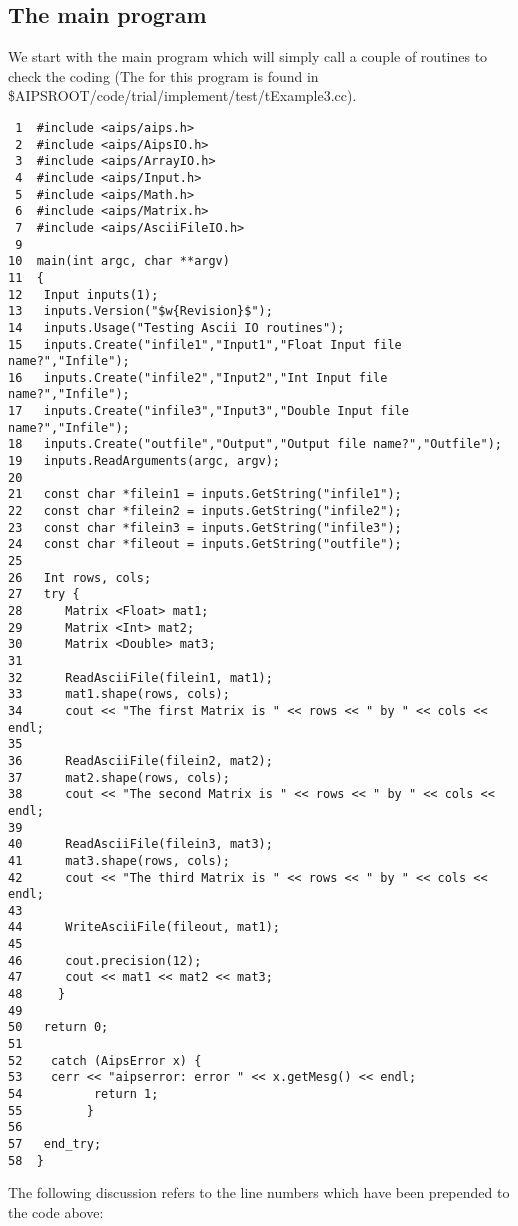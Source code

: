 \subsection{The main program}

We start with the main program which will simply call a couple of routines to
check the coding 
(The 
for this program is found in 
\$AIPSROOT/code/trial/implement/test/tExample3.cc). 

\begin{verbatim}
 1  #include <aips/aips.h>
 2  #include <aips/AipsIO.h>
 3  #include <aips/ArrayIO.h>
 4  #include <aips/Input.h>
 5  #include <aips/Math.h>
 6  #include <aips/Matrix.h>
 7  #include <aips/AsciiFileIO.h>
 9  
10  main(int argc, char **argv)
11  {
12   Input inputs(1);
13   inputs.Version("$w{Revision}$");
14   inputs.Usage("Testing Ascii IO routines");
15   inputs.Create("infile1","Input1","Float Input file name?","Infile");
16   inputs.Create("infile2","Input2","Int Input file name?","Infile");
17   inputs.Create("infile3","Input3","Double Input file name?","Infile");
18   inputs.Create("outfile","Output","Output file name?","Outfile");
19   inputs.ReadArguments(argc, argv);
20  
21   const char *filein1 = inputs.GetString("infile1");
22   const char *filein2 = inputs.GetString("infile2");
23   const char *filein3 = inputs.GetString("infile3");
24   const char *fileout = inputs.GetString("outfile");
25  
26   Int rows, cols;
27   try {
28      Matrix <Float> mat1;
29      Matrix <Int> mat2;
30      Matrix <Double> mat3;
31  
32      ReadAsciiFile(filein1, mat1);
33      mat1.shape(rows, cols);
34      cout << "The first Matrix is " << rows << " by " << cols << endl;
35  
36      ReadAsciiFile(filein2, mat2);
37      mat2.shape(rows, cols);
38      cout << "The second Matrix is " << rows << " by " << cols << endl;
39  
40      ReadAsciiFile(filein3, mat3);
41      mat3.shape(rows, cols);
42      cout << "The third Matrix is " << rows << " by " << cols << endl;
43  
44      WriteAsciiFile(fileout, mat1);
45  
46      cout.precision(12);
47      cout << mat1 << mat2 << mat3;
48     }
49  
50   return 0;
51
52    catch (AipsError x) {
53    cerr << "aipserror: error " << x.getMesg() << endl;
54          return 1;
55         }
56
57   end_try;
58  }
\end{verbatim}


The following discussion refers to the line numbers which have been prepended 
to the code above:

